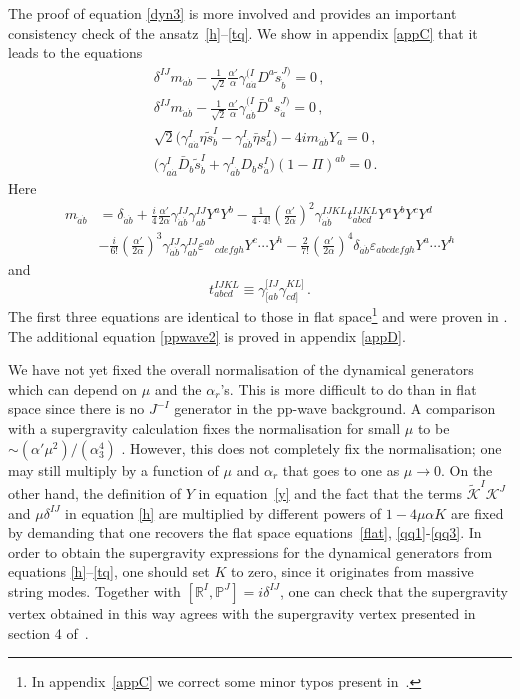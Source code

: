 \documentclass[12pt]{article}
\def\da{\dot{a}}
\def\db{\dot{b}}
\def\a{\alpha}
\def\g{\gamma}
\def\d{\delta}
\def\e{\varepsilon}
\def\m{\mu}
\def\mc{\mathcal}
\def\wt{\widetilde}
\numberwithin{equation}{section} \setlength{\textwidth}{17cm}
\begin{document}
\noindent The proof of equation \eqref{dyn3} is more involved and provides an important consistency
check of the ansatz~\eqref{h}--\eqref{tq}. We show in appendix \ref{appC} that it leads to the equations
\begin{align}
\label{qq1}
&\d^{IJ}m_{\da\db}-\frac{1}{\sqrt{2}}\frac{\a'}{\a}\g^{(I}_{a\da}D^a\tilde{s}^{J)}_{\db}=0\,,\\
&\d^{IJ}m_{\da\db}-\frac{1}{\sqrt{2}}\frac{\a'}{\a}\g^{(I}_{a\db}\bar{D}^as^{J)}_{\da}=0\,,\\
\label{qq3}
&\sqrt{2}\bigl(\g^I_{a\da}\eta\tilde{s}^I_{\db}-\g^{I}_{a\db}\bar{\eta}s^I_{\da}\bigr)-4im_{\da\db}Y_a=0\,,\\
\label{ppwave2}
&\bigl(\g^I_{a\da}\bar{D}_b\tilde{s}^I_{\db}+\g^I_{a\db}D_bs^I_{\da}\bigr)(1-\Pi)^{ab}=0\,.
\end{align}
Here
\begin{align}
m_{\dot{a}\dot{b}} & =\d_{\dot{a}\dot{b}}+\frac{i}{4}\frac{\a'}{2\a}\g^{IJ}_{\dot{a}\dot{b}}\g^{IJ}_{ab}Y^aY^b
-\frac{1}{4\cdot 4!}\left(\frac{\a'}{2\a}\right)^2\g^{IJKL}_{\dot{a}\dot{b}}t^{IJKL}_{abcd}Y^aY^bY^cY^d
\nonumber\\
&-\frac{i}{6!}\left(\frac{\a'}{2\a}\right)^3\g^{IJ}_{\dot{a}\dot{b}}\g^{IJ}_{ab}{\e^{ab}}_{cdefgh}Y^c\cdots
Y^h-\frac{2}{7!}\left(\frac{\a'}{2\a}\right)^4\d_{\dot{a}\dot{b}}\e_{abcdefgh}Y^a\cdots Y^h
\end{align}
and
\begin{equation}
t^{IJKL}_{abcd}\equiv\g^{[IJ}_{[ab}\g^{KL]}_{cd]}\,.
\end{equation}
The first three equations are identical to those in flat space\footnote{In appendix~\ref{appC} we correct some 
minor typos present in~\cite{gsb}.} and were proven in \cite{gsb}.
The additional equation \eqref{ppwave2} is proved in appendix \ref{appD}. 

\noindent We have not yet fixed the overall normalisation of the
dynamical generators which can depend on $\m$ and the $\a_r$'s. 
This is more difficult to do than in flat space since there is no $J^{-I}$ generator in the 
pp-wave background. 
A comparison with a
supergravity calculation fixes the normalisation for small $\m$ to be $\sim(\a'\m^2)/(\a_3^4)$ \cite{kim}.
However, this does not
completely fix the normalisation; one may still multiply by a function of
$\m$ and $\a_r$ that goes to one as $\m\to 0$. On the other hand, the definition of $Y$ in
equation~\eqref{y} and the fact that the terms $\wt{\mc K}^I{\mc K}^J$ and $\m\d^{IJ}$ in equation \eqref{h} 
are multiplied by different powers of $1-4 \m\a K$ are fixed by demanding that one recovers the flat space 
equations~\eqref{flat}, \eqref{qq1}-\eqref{qq3}.
In order to obtain the supergravity expressions for the dynamical
generators from equations \eqref{h}--\eqref{tq}, one should set $K$ to zero, since it originates from  
massive string modes. Together with
$[\mathbb{R}^I,\mathbb{P}^J]=i\d^{IJ}$, one can check that the supergravity vertex obtained in this way
agrees with the supergravity vertex presented in section 4 of~\cite{sv}.
\end{document}
